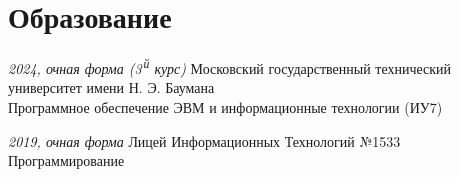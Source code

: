 \section*{Образование}

\aside
{\textit{2024, очная форма (3\textsuperscript{\,й} курс)}}
{Московский государственный технический университет имени Н. Э. Баумана\\Программное обеспечение ЭВМ и информационные технологии (ИУ7)}

\aside
{\textit{2019, очная форма}}
{Лицей Информационных Технологий №1533\\Программирование}